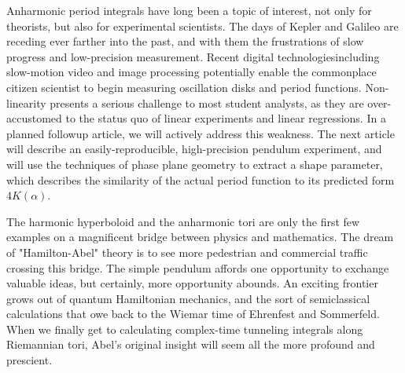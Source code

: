 \documentclass[nofootinbib,preprint]{revtex4-1}
\begin{document}
Anharmonic period integrals have long been a topic of interest, not only for theorists, but also for 
experimental scientists. The days of Kepler and Galileo are receding ever farther into the past, and 
with them the frustrations of slow progress and low-precision measurement. Recent digital 
technologies\textemdash including slow-motion video and image processing\textemdash 
potentially enable the commonplace citizen scientist to begin measuring oscillation disks and 
period functions. Non-linearity presents a serious challenge to most student analysts, as they
are over-accustomed to the status quo of linear experiments and linear regressions. In a planned 
followup article, we will actively address this weakness. The next article will describe an 
easily-reproducible, high-precision pendulum experiment, and will use the techniques of phase 
plane geometry to extract a shape parameter, which describes the similarity of the actual period 
function to its predicted form $4K(\alpha)$.
 
The harmonic hyperboloid and the anharmonic tori are only the first few examples on a magnificent 
bridge between physics and mathematics. The dream of "Hamilton-Abel" theory is to see more pedestrian 
and commercial traffic crossing this bridge. The simple pendulum affords one opportunity to exchange 
valuable ideas, but certainly, more opportunity abounds. An exciting frontier grows out of quantum 
Hamiltonian mechanics, and the sort of semiclassical calculations that owe back to the Wiemar time 
of Ehrenfest and Sommerfeld. When we finally get to calculating complex-time tunneling integrals 
along Riemannian tori, Abel's original insight will seem all the more profound and prescient. \pagebreak




\end{document}
